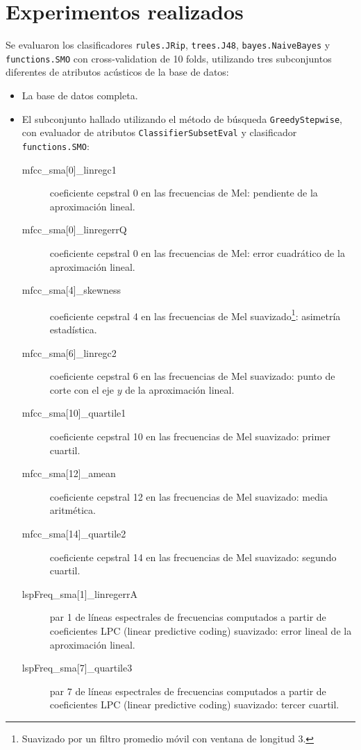 \documentclass[10pt,a4paper]{article}
\begin{document}
\section{Experimentos realizados}

Se evaluaron los clasificadores \texttt{rules.JRip}, \texttt{trees.J48}, \texttt{bayes.NaiveBayes} y \texttt{functions.SMO} con cross-validation de 10 folds, utilizando tres subconjuntos diferentes de atributos acústicos de la base de datos:

\begin{itemize}
  \item La base de datos completa.
  
  \item El subconjunto hallado utilizando el método de búsqueda \texttt{GreedyStepwise}, con evaluador de atributos \texttt{ClassifierSubsetEval} y clasificador \texttt{functions.SMO}:
  \begin{description}
    \item[mfcc\_sma{[}0{]}\_linregc1] coeficiente cepstral 0 en las frecuencias de Mel: pendiente de la aproximación lineal.
    \item[mfcc\_sma{[}0{]}\_linregerrQ] coeficiente cepstral 0 en las frecuencias de Mel: error cuadrático de la aproximación lineal.
    \item[mfcc\_sma{[}4{]}\_skewness] coeficiente cepstral 4 en las frecuencias de Mel suavizado\footnote{Suavizado por un filtro promedio móvil con ventana de longitud 3.}: asimetría estadística.
    \item[mfcc\_sma{[}6{]}\_linregc2] coeficiente cepstral 6 en las frecuencias de Mel suavizado: punto de corte con el eje $y$ de la aproximación lineal.
    \item[mfcc\_sma{[}10{]}\_quartile1] coeficiente cepstral 10 en las frecuencias de Mel suavizado: primer cuartil.
    \item[mfcc\_sma{[}12{]}\_amean] coeficiente cepstral 12 en las frecuencias de Mel suavizado: media aritmética.
    \item[mfcc\_sma{[}14{]}\_quartile2] coeficiente cepstral 14 en las frecuencias de Mel suavizado: segundo cuartil.
    \item[lspFreq\_sma{[}1{]}\_linregerrA] par 1 de líneas espectrales de frecuencias computados a partir de coeficientes LPC (linear predictive coding) suavizado: error lineal de la aproximación lineal.
    \item[lspFreq\_sma{[}7{]}\_quartile3] par 7 de líneas espectrales de frecuencias computados a partir de coeficientes LPC (linear predictive coding) suavizado: tercer cuartil.

\end{description}
\end{itemize}
\end{document}
